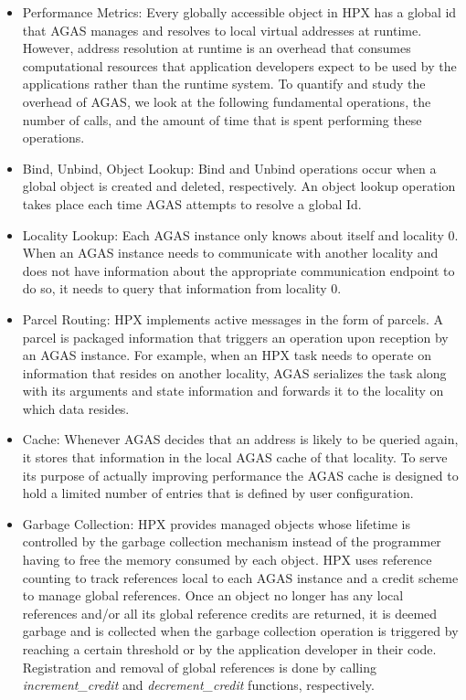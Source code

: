 \begin{itemize}
\item{Performance Metrics}:
Every globally accessible object in HPX has a global id that AGAS manages and
resolves to local virtual addresses at runtime. However, address resolution at runtime is
an overhead that consumes computational resources that application developers expect to be used by the
applications rather than the runtime system. To quantify and study the overhead of AGAS, we look at the following
fundamental operations, the number of calls, and the amount of time that is
spent performing these operations.

\item{Bind, Unbind, Object Lookup}:
Bind and Unbind operations occur when a global object is created and deleted, 
respectively. An object lookup operation takes place each time AGAS attempts 
to resolve a global Id.

\item{Locality Lookup}:
Each AGAS instance only knows about itself and locality 0. When an AGAS
instance needs to communicate with another locality and does not have
information about the appropriate communication endpoint to do so, it needs to
query that information from locality 0.

\item{Parcel Routing}:
HPX implements active messages in the form of parcels\cite{wagle2018methodology}. A parcel is packaged
information that triggers an operation upon reception by an AGAS instance. For
example, when an HPX task needs to operate on information that resides on
another locality, AGAS serializes the task along with its arguments and state
information and forwards it to the locality on which data resides.

\item{Cache}:
Whenever AGAS decides that an address is likely to be queried again, it stores
that information in the local AGAS cache of that locality. To serve its purpose of actually improving
performance the AGAS cache is designed to hold a limited number of entries that is
defined by user configuration.

\item{Garbage Collection}:
\label{sec:garbage_collection}
HPX provides managed objects whose lifetime is controlled by the garbage
collection mechanism instead of the programmer having to free the memory
consumed by each object. HPX uses reference counting to track references local
to each AGAS instance and a credit scheme to manage global references. Once an
object no longer has any local references and/or all its global reference
credits are returned, it is deemed garbage and is collected when the garbage
collection operation is triggered by reaching a certain threshold or by the
application developer in their code. Registration and removal of global references is done by
calling \textit{increment\_credit} and \textit{decrement\_credit} functions, respectively.
\end{itemize}

